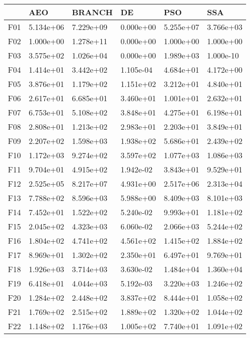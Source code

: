 \begin{tabular}{llllll}
\toprule
{} &        AEO &     BRANCH &         DE &        PSO &        SSA \\
\midrule
F01  &  5.134e+06 &  7.229e+09 &  0.000e+00 &  5.255e+07 &  3.766e+03 \\
F02  &  1.000e+00 &  1.278e+11 &  0.000e+00 &  1.000e+00 &  1.000e+00 \\
F03  &  3.575e+02 &  1.026e+04 &  0.000e+00 &  1.989e+03 &  1.000e-10 \\
F04  &  1.414e+01 &  3.442e+02 &  1.105e-04 &  4.684e+01 &  4.172e+00 \\
F05  &  3.876e+01 &  1.179e+02 &  1.151e+02 &  3.212e+01 &  4.840e+01 \\
F06  &  2.617e+01 &  6.685e+01 &  3.460e+01 &  1.001e+01 &  2.632e+01 \\
F07  &  6.753e+01 &  5.108e+02 &  3.848e+01 &  4.275e+01 &  6.198e+01 \\
F08  &  2.808e+01 &  1.213e+02 &  2.983e+01 &  2.203e+01 &  3.849e+01 \\
F09  &  2.207e+02 &  1.598e+03 &  1.938e+02 &  5.686e+01 &  2.439e+02 \\
F10  &  1.172e+03 &  9.274e+02 &  3.597e+02 &  1.077e+03 &  1.086e+03 \\
F11  &  9.704e+01 &  4.915e+02 &  1.942e-02 &  3.843e+01 &  9.529e+01 \\
F12  &  2.525e+05 &  8.217e+07 &  4.931e+00 &  2.517e+06 &  2.313e+04 \\
F13  &  7.788e+02 &  8.596e+03 &  5.988e+00 &  8.409e+03 &  8.101e+03 \\
F14  &  7.452e+01 &  1.522e+02 &  5.240e-02 &  9.993e+01 &  1.181e+02 \\
F15  &  2.045e+02 &  4.323e+03 &  6.060e-02 &  2.066e+03 &  5.244e+02 \\
F16  &  1.804e+02 &  4.741e+02 &  4.561e+02 &  1.415e+02 &  1.884e+02 \\
F17  &  8.969e+01 &  1.302e+02 &  2.350e+01 &  6.497e+01 &  9.769e+01 \\
F18  &  1.926e+03 &  3.714e+03 &  3.630e-02 &  1.484e+04 &  1.360e+04 \\
F19  &  6.418e+01 &  4.044e+03 &  5.192e-03 &  3.220e+03 &  1.246e+02 \\
F20  &  1.284e+02 &  2.448e+02 &  3.837e+02 &  8.444e+01 &  1.058e+02 \\
F21  &  1.769e+02 &  2.515e+02 &  1.889e+02 &  1.320e+02 &  1.044e+02 \\
F22  &  1.148e+02 &  1.176e+03 &  1.005e+02 &  7.740e+01 &  1.091e+02 \\

\end{tabular}
